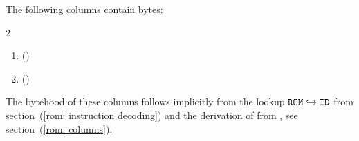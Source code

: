 The following columns contain bytes:
\begin{multicols}{2}
	\begin{enumerate}
		\item \PBCB{} \quad (\trash)
		\item \opc{} \quad (\trash)
	\end{enumerate}
\end{multicols}
\saNote{}
The bytehood of these columns follows implicitly from the lookup
$\texttt{ROM} \hookrightarrow \texttt{ID}$
from section~(\ref{rom: instruction decoding})
and the derivation of \opc{} from \pbcb{}, see section~(\ref{rom: columns}).
